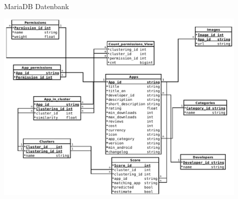 \documentclass[compress,t]{beamer}
\begin{document}
\begin{frame}{MariaDB Datenbank}

    \begin{center}
        \includegraphics[width=0.9\textwidth]{img/Scheme_extended_3.png}
    \end{center}

\end{frame}

\end{document}
